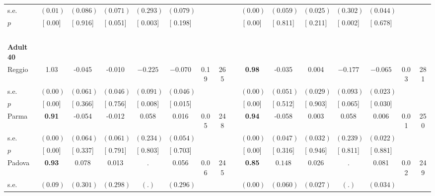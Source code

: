 \begin{longtable}{L{8em} c c c c c c c p{1em} c c c c c c c}
\quad \quad \quad \quad s.e.& $ (     0.01)$ & $ (    0.086)$ & $ (    0.071)$ & $ (    0.293)$ & $ (    0.079)$ & & & & $ (     0.00)$ & $ (    0.059)$ & $ (    0.025)$ & $ (    0.302)$ & $ (    0.044)$ & &  \\*
\quad \quad \quad \quad $ p$ & [     0.00] & [    0.916] & [    0.051] & [    0.003] & [    0.198] & & & & [     0.00] & [    0.811] & [    0.211] & [    0.002] & [    0.678] & &  \\[1em]
~\\[1em]
\quad \quad \textbf{Adult 40} & & & & & & & & & & & & & & & \\* 
\quad \quad \quad Reggio& 1.03 &    -0.045 &    -0.010 & $ \mathbf{   -0.225}$ & $ \mathbf{   -0.070}$ &      0.19 &       265 & & \textbf{     0.98} &    -0.035 &     0.004 & $ \mathbf{   -0.177}$ & $ \mathbf{   -0.065}$ &      0.03 &       281  \\*
\quad \quad \quad \quad s.e.& $ (     0.00)$ & $ (    0.061)$ & $ (    0.046)$ & $ (    0.091)$ & $ (    0.046)$ & & & & $ (     0.00)$ & $ (    0.051)$ & $ (    0.029)$ & $ (    0.093)$ & $ (    0.023)$ & &  \\*
\quad \quad \quad \quad $ p$ & [     0.00] & [    0.366] & [    0.756] & [    0.008] & [    0.015] & & & & [     0.00] & [    0.512] & [    0.903] & [    0.065] & [    0.030] & &  \\[1em]
\quad \quad \quad Parma& \textbf{     0.91} &    -0.054 &    -0.012 &     0.058 &     0.016 &      0.05 &       248 & & \textbf{     0.94} &    -0.058 &     0.003 &     0.058 &     0.006 &      0.01 &       250  \\*
\quad \quad \quad \quad s.e.& $ (     0.00)$ & $ (    0.064)$ & $ (    0.061)$ & $ (    0.234)$ & $ (    0.054)$ & & & & $ (     0.00)$ & $ (    0.047)$ & $ (    0.032)$ & $ (    0.239)$ & $ (    0.022)$ & &  \\*
\quad \quad \quad \quad $ p$ & [     0.00] & [    0.337] & [    0.791] & [    0.803] & [    0.703] & & & & [     0.00] & [    0.316] & [    0.946] & [    0.811] & [    0.881] & &  \\[1em]
\quad \quad \quad Padova& \textbf{     0.93} &     0.078 &     0.013 &         . &     0.056 &      0.06 &       245 & & \textbf{     0.85} & $ \mathbf{    0.148}$ &     0.026 &         . &     0.081 &      0.02 &       249  \\*
\quad \quad \quad \quad s.e.& $ (     0.09)$ & $ (    0.301)$ & $ (    0.298)$ & $ (        .)$ & $ (    0.296)$ & & & & $ (     0.00)$ & $ (    0.060)$ & $ (    0.027)$ & $ (        .)$ & $ (    0.034)$ & &  \\*

\end{longtable}
